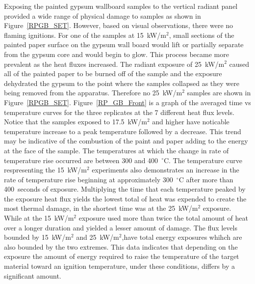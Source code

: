\documentclass[twoside]{uocthesis}
\begin{document}
{Exposing the painted gypsum wallboard samples to the vertical radiant panel provided a wide range of physical damage to samples as shown in Figure~\ref{RPGB_SET}.  However, based on visual observations, there were no flaming ignitions.  For one of the samples at 15~kW/m$^2$, small sections of the painted paper surface on the gypsum wall board would lift or partially separate from the gypsum core and would begin to glow.  This process became more prevalent as the heat fluxes increased.  The radiant exposure of 25~kW/m$^2$ caused all of the painted paper to be burned off of the sample and the exposure dehydrated the gypsum to the point where the samples collapsed as they were being removed from the apparatus.  Therefore no 25~kW/m$^2$ samples are shown in Figure~\ref{RPGB_SET}.   Figure~\ref{RP_GB_Front} is a graph of the averaged time vs temperature curves for the three replicates at the 7 different heat flux levels.  Notice that the samples exposed to 17.5~kW/m$^2$ and higher have noticable temperature increase to a peak temperature followed by a decrease.  This trend may be indicative of the combustion of the paint and paper adding to the energy at the face of the sample. The temperatures at which the change in rate of temperature rise occurred are between 300 and 400~$^{\circ}$C.  The temperature curve respresenting the 15~kW/m$^2$ experiments also demonstrates an increase in the rate of temperature rise beginning at approximately 300~$^{\circ}$C after more than 400~seconds of exposure.  Multiplying the time that each temperature peaked by the exposure heat flux yields the lowest total of heat was expended to create the most thermal damage, in the shortest time was at the 25~kW/m$^2$ exposure.  While at the 15~kW/m$^2$ exposure used more than twice the total amount of heat over a longer duration and yielded a lesser amount of damage.  The flux levels bounded by 15~kW/m$^2$ and 25~kW/m$^2$,have total energy exposures whihch are also bounded by the two extremes. This data indicates that depending on the exposure the amount of energy required to raise the temperature of the target material toward an ignition temperature, under these conditions, differs by a significant amount.        
  
}
\end{document}
